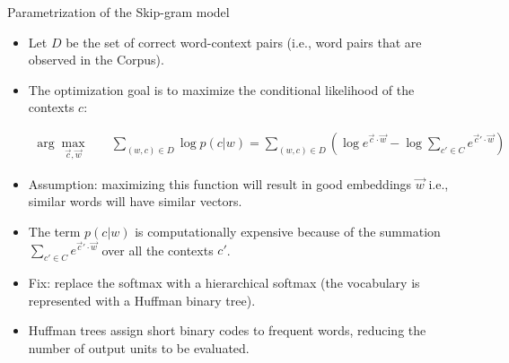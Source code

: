 \documentclass[handout]{beamer}
\begin{document}
\begin{frame}{Parametrization of the Skip-gram model}
\begin{scriptsize}
\begin{itemize}

\item Let $D$ be the set of correct word-context pairs (i.e., word pairs that are observed in the Corpus).

\item The optimization goal is to maximize the conditional likelihood of the contexts $c$:


\begin{equation}
\begin{split}
\operatorname{arg} \max_{\vec{c}, \vec{w}} & \quad \sum_{(w,c) \in D}{\log p(c|w)} = \sum_{(w,c) \in D} ( \log e^{\vec{c}\cdot \vec{w}} - \log \sum_{c'\in C} e^{\vec{c}'\cdot \vec{w}}  )
\end{split}
\end{equation}


\item Assumption: maximizing this function will result in good embeddings $\vec{w}$ i.e.,  similar words will have similar vectors.

\item The term $p(c|w)$ is computationally expensive because of the summation $\sum_{c'\in C} e^{\vec{c}'\cdot \vec{w}}$ over all the contexts $c'$.

\item Fix: replace the softmax with a hierarchical softmax (the vocabulary is represented with a Huffman binary tree). 

\item Huffman trees assign short binary codes to frequent words, reducing the number of output units to be evaluated.

\end{itemize}
\end{scriptsize}
\end{frame}



\end{document}
